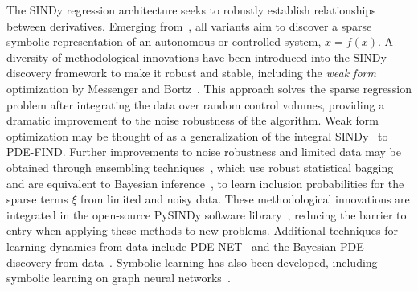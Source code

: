 \documentclass{article}
\newcommand{\red}[1]{\textcolor{red}{#1}}
\begin{document}


The SINDy regression architecture seeks to robustly establish relationships between derivatives.  Emerging from~\cite{Brunton2016,brunton2022data}, all variants aim to discover a sparse symbolic representation of an autonomous or controlled system, $\dot x = f(x)$.  A diversity of methodological innovations have been introduced into the SINDy discovery framework to make it robust and stable, including the \emph{weak form} optimization by Messenger and Bortz~\cite{messenger2021bweak,messenger2021weak}.  This approach solves the sparse regression problem after integrating the data over random control volumes, providing a dramatic improvement to the noise robustness of the algorithm.  Weak form optimization may be thought of as a generalization of the integral SINDy~\cite{Schaeffer2017pre} to PDE-FIND.
Further improvements to noise robustness and limited data may be obtained through ensembling techniques~\cite{fasel2022ensemble}, which use robust statistical bagging and are equivalent to Bayesian inference~\cite{gao2022bayesian,gao2023convergence}, to learn inclusion probabilities for the sparse terms $\xi$ from limited and noisy data.
These methodological innovations are integrated in the open-source PySINDy software library~\cite{kaptanoglu2021pysindy}, reducing the barrier to entry when applying these methods to new problems.  Additional techniques for learning dynamics from data include PDE-NET~\cite{long2018pde,long2019pde} and the Bayesian PDE discovery from data~\cite{atkinson2020bayesian}. Symbolic learning has also been developed, including symbolic learning on graph neural networks~\cite{cranmer2019learning,cranmer2020discovering,sanchez2020learning}.



\end{document}
